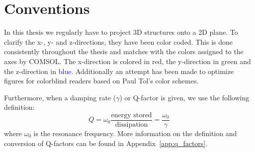 \chapter*{Conventions}
\label{chap:conventions}
In this thesis we regularly have to project 3D structures onto a 2D plane. To clarify the x-, y- and z-directions, they have been color coded. This is done consistently throughout the thesis and matches with the colors assigned to the axes by COMSOL. The x-direction is colored in \textcolor{x_axis_color}{red}, the y-direction in \textcolor{y_axis_color}{green} and the z-direction in \textcolor{blue}{blue}. Additionally an attempt has been made to optimize figures for colorblind readers based on Paul Tol's color schemes\cite{paul_tol}.

Furthermore, when a damping rate ($\gamma$) or Q-factor is given, we use the following definition:
\begin{equation*}
    Q = \omega_0 \frac{\text{energy stored}}{\text{dissipation}} = \frac{\omega_0}{\gamma}
\end{equation*}
where $\omega_0$ is the resonance frequency. More information on the definition and conversion of Q-factors can be found in Appendix~\ref{app:q_factors}.

